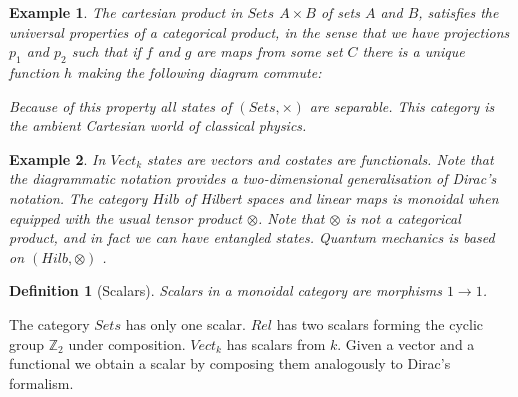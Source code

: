 \documentclass{article}
\newtheorem{definition}{Definition}
\newtheorem{example}{Example}
\begin{document}
\begin{example}
The cartesian product in $Sets$ $A \times B$ of sets $A$ and $B$, satisfies the universal properties of a categorical product, in the sense that we have projections $p_1$ and $p_2$ such that if $f$ and $g$ are maps from some set $C$ there is a unique function $h$ making the following diagram commute:
\begin{center}
\end{center}
Because of this property all states of $(Sets,\times)$ are separable. This category is the ambient Cartesian world of classical physics.
\end{example}
\begin{example}
In $Vect_k$ states are vectors and costates are functionals. Note that the diagrammatic notation provides a two-dimensional generalisation of Dirac's notation. The category $Hilb$ of Hilbert spaces and linear maps is monoidal when equipped with the usual tensor product $\otimes$. Note that $\otimes$ is not a categorical product, and in fact we can have entangled states. Quantum mechanics is based on $(Hilb, \otimes)$ \cite{Vicary12}.
\end{example}
\begin{definition}[Scalars]
Scalars in a monoidal category are morphisms $1 \rightarrow 1$.
\end{definition}
The category $Sets$ has only one scalar. $Rel$ has two scalars forming the cyclic group $\mathbb{Z}_2$ under composition. $Vect_k$ has scalars from $k$. Given a vector and a functional we obtain a scalar by composing them analogously to Dirac's formalism.
\end{document}
